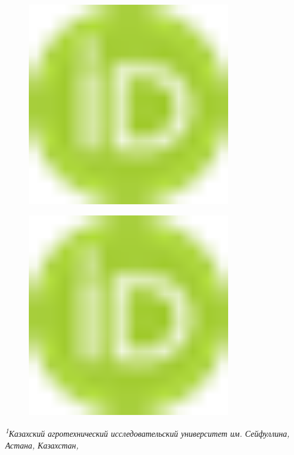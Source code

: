 \begin{figure}[H]
	\centering
	\includegraphics[width=0.8\textwidth]{media/gorn3/image1}
	\caption*{}
\end{figure}

\begin{figure}[H]
	\centering
	\includegraphics[width=0.8\textwidth]{media/gorn3/image1}
	\caption*{}
\end{figure}


\emph{\textsuperscript{1}Казахский агротехнический исследовательский
университет им. Сейфуллина, Астана, Казахстан,}

